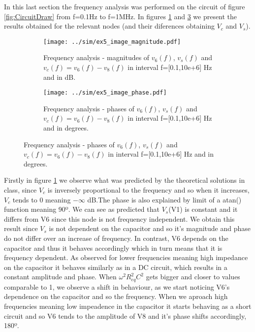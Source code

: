 In this last section the frequency analysis was performed on the circuit of figure \ref{fig:CircuitDraw} from f=0.1Hz to f=1MHz. In figures \ref{fig:Ex5_Image_Magnitude} and \ref{fig:Ex5_Image_Phase} we present the results obtained for the relevant nodes (and their diferences obtaining $V_c$ and $V_s$).
 \begin{figure}[H]
 \footnotesize
\begin{subfigure}{.49\linewidth}
 \footnotesize
  \centering
  \texttt{[image: ../sim/ex5\_image\_magnitude.pdf]}
   \footnotesize
\caption{Frequency analysis - magnitudes of $v_6(f)$, $v_s(f)$ and $v_c(f)=v_6(f)-v_8(f)$ in interval f=[0.1,10e+6] Hz and in dB.}
\label{fig:Ex5_Image_Magnitude}
\end{subfigure}
\hspace{5mm}
\begin{subfigure}{.49\linewidth}
  \centering
  \texttt{[image: ../sim/ex5\_image\_phase.pdf]}  
\caption{Frequency analysis - phases of $v_6(f)$, $v_s(f)$ and $v_c(f)=v_6(f)-v_8(f)$ in interval f=[0.1,10e+6] Hz and in degrees.}
\label{fig:Ex5_Image_Phase}
\end{subfigure}
\end{figure} 

Firstly in figure \ref{fig:Ex5_Image_Magnitude} we observe what was predicted by the theoretical solutions in class, since $V_c$ is inversely proportional to the frequency and so when it increases, $V_c$  tends to 0 meaning $-\infty$ dB.The phase is also explained by limit of a atan() function meaning 90º. We can see as predicted that $V_s$(V1) is constant and it differs from V6 since this node is not frequency independent. We obtain this result since $V_s$ is not dependent on the capacitor and so it's magnitude and phase do not differ over an increase of frequency. In contrast, V6 depends on the capacitor and thus it behaves accordingly which in turn means that it is frequency dependent. As observed for lower frequencies meaning high impedance on the capacitor it behaves similarly as in a DC circuit, which results in a constant amplitude and phase. When $\omega^2R_{eq}^2C^2$ gets bigger and closer to values comparable to 1, we observe a shift in behaviour, as we start noticing V6's dependence on the capacitor and so the frequency. When we aproach high frequencies meaning low impeadence in the capacitor it starts behaving as a short circuit and so V6 tends to the amplitude of V8 and it's phase shifts accordingly, 180º.   

